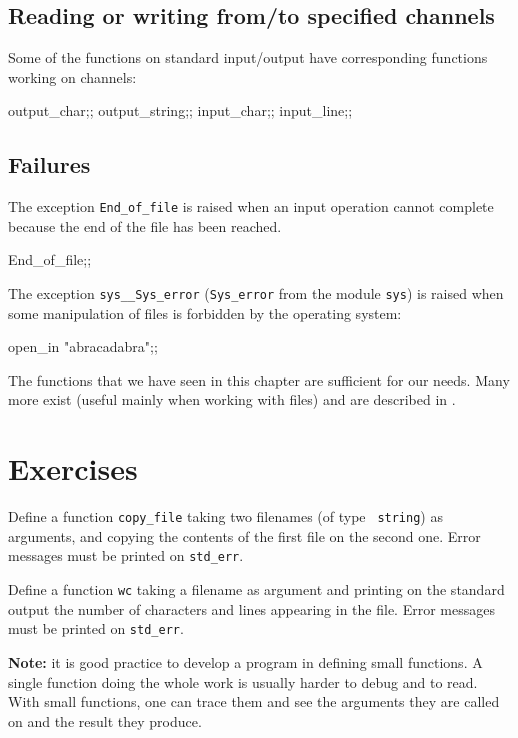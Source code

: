 \subsection{Reading or writing from/to specified channels}

Some of the functions on standard input/output have corresponding
functions working on channels:
\begin{caml_example}
output_char;;
output_string;;
input_char;;
input_line;;
\end{caml_example}

\subsection{Failures}

The exception \verb|End_of_file| is raised when an input operation
cannot complete because the end of the file has been reached.
\begin{caml_example}
End_of_file;;
\end{caml_example}

The exception \verb|sys__Sys_error| (\verb|Sys_error| from the module
{\tt sys}) is raised when some manipulation of files is forbidden by
the operating system:
\begin{caml_example}
open_in "abracadabra";;
\end{caml_example}

The functions that we have seen in this chapter are sufficient for our
needs. Many more exist (useful mainly when working with files) and are
described in \cite{CamlLightDoc}.

\section*{Exercises}

\begin{exo}\label{IO:1}
Define a function \verb|copy_file| taking two filenames (of type {\tt
string}) as arguments, and copying the contents of the first file on
the second one. Error messages must be printed on \verb|std_err|.
\end{exo}

\begin{exo}\label{IO:2}
Define a function {\tt wc} taking a filename as argument and printing
on the standard output the number of characters and lines appearing
in the file. Error messages must be printed on \verb|std_err|.
\end{exo}

\noindent
{\bf Note:} it is good practice to develop a program in defining small
functions. A single function doing the whole work is usually harder to
debug and to read. With small functions, one can trace them and see
the arguments they are called on and the result they produce.
